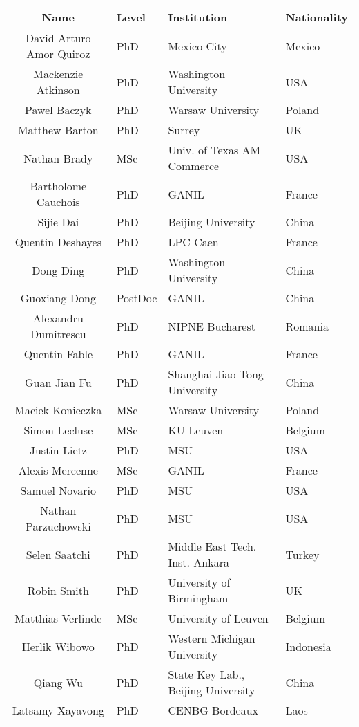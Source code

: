\documentclass[prc,amsart,english]{revtex4}
\begin{document}
\begin{table}[hbtp]
  \begin{ruledtabular}
    \begin{tabular}{|c||l|l|l|}
     Name & Level &Institution &Nationality  \\\hline
David Arturo Amor Quiroz & PhD & Mexico City & Mexico  \\
Mackenzie Atkinson & PhD& Washington University & USA  \\
Pawel Baczyk & PhD& Warsaw University & Poland \\
Matthew Barton & PhD& Surrey & UK \\
Nathan Brady  & MSc& Univ. of Texas AM Commerce & USA \\
Bartholome Cauchois & PhD & GANIL & France \\
Sijie Dai & PhD& Beijing  University & China \\
Quentin Deshayes & PhD& LPC Caen & France \\
Dong Ding &PhD   & Washington University & China \\
Guoxiang Dong & PostDoc & GANIL & China \\
Alexandru Dumitrescu & PhD& NIPNE Bucharest & Romania \\
Quentin Fable & PhD& GANIL & France \\
Guan Jian Fu & PhD& Shanghai Jiao Tong University & China \\
Maciek Konieczka &MSc&  Warsaw University & Poland \\
Simon Lecluse & MSc & KU Leuven & Belgium \\
Justin Lietz & PhD& MSU & USA \\
Alexis Mercenne & MSc & GANIL & France \\
Samuel Novario & PhD& MSU & USA \\
Nathan Parzuchowski &PhD & MSU & USA \\
Selen Saatchi & PhD& Middle East Tech. Inst. Ankara & Turkey \\
Robin Smith & PhD& University of Birmingham & UK \\
Matthias Verlinde & MSc & University of Leuven & Belgium \\
Herlik Wibowo & PhD & Western Michigan University & Indonesia \\ 
Qiang Wu & PhD & State Key Lab., Beijing University & China \\
Latsamy Xayavong & PhD & CENBG Bordeaux & Laos \\ 
    \end{tabular}
  \end{ruledtabular}
\end{table} 
\end{document}
